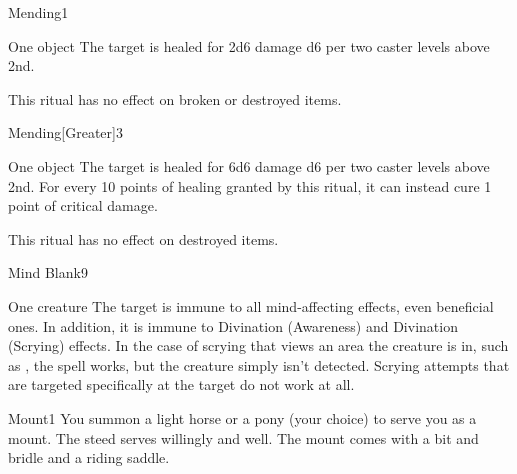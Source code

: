 \begin{spellsection}{Mending}{1}
\begin{spelltarget}{One object}
    \spelleffect The target is healed for 2d6 damage \add d6 per two caster levels above 2nd. 
\end{spelltarget}
\spellnotes This ritual has no effect on broken or destroyed items. 
\end{spellsection}

\begin{spellsection}{Mending}[Greater]{3}
\begin{spelltarget}{One object}
    \spelleffect The target is healed for 6d6 damage \add d6 per two caster levels above 2nd. For every 10 points of healing granted by this ritual, it can instead cure 1 point of critical damage.
\end{spelltarget}
\spellnotes This ritual has no effect on destroyed items.
\end{spellsection}

\begin{spellsection}{Mind Blank}{9}
\spellrng{\rngclose}
\spelldur \durext
\begin{spelltarget}{One creature}
    \spelleffect The target is immune to all mind-affecting effects, even beneficial ones. In addition, it is immune to Divination (Awareness) and Divination (Scrying) effects. In the case of scrying that views an area the creature is in, such as , the spell works, but the creature simply isn't detected. Scrying attempts that are targeted specifically at the target do not work at all.
\end{spelltarget}
\end{spellsection}

\begin{spellsection}{Mount}{1}
\spellrng{\rngclose}
\spelldur \durext \dismissable
{}
\spellline
\spelleffect You summon a light horse or a pony (your choice) to serve you as a mount. The steed serves willingly and well. The mount comes with a bit and bridle and a riding saddle.
\end{spellsection}

